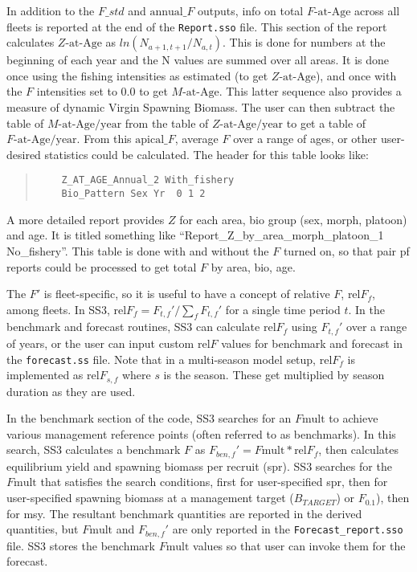 In addition to the $F\_std$ and $\text{annual\_}F$ outputs, info on total $F\text{-at-Age}$ across all fleets is reported at the end of the \texttt{Report.sso} file. This section of the report calculates $Z\text{-at-Age}$ as $ln(N_{a+1,t+1}/N_{a,t})$. This is done for numbers at the beginning of each year and the N values are summed over all areas. It is done once using the fishing intensities as estimated (to get $Z\text{-at-Age}$), and once with the $F$ intensities set to 0.0 to get $M\text{-at-Age}$. This latter sequence also provides a measure of dynamic Virgin Spawning Biomass. The user can then subtract the table of $M\text{-at-Age/year}$ from the table of $Z\text{-at-Age/year}$ to get a table of $F\text{-at-Age/year}$. From this $\text{apical\_}F$, average $F$ over a range of ages, or other user-desired statistics could be calculated. The header for this table looks like:
\begin{quote}
	\begin{verbatim}
	Z_AT_AGE_Annual_2 With_fishery
	Bio_Pattern Sex Yr  0 1 2
	\end{verbatim}
\end{quote}

A more detailed report provides $Z$ for each area, bio group (sex, morph, platoon) and age. It is titled something like ``Report\_Z\_by\_area\_morph\_platoon\_1 No\_fishery''. This table is done with and without the $F$ turned on, so that pair pf reports could be processed to get total $F$ by area, bio, age.

The $F'$ is fleet-specific, so it is useful to have a concept of relative $F$, $\text{rel}F_f$, among fleets. In SS3, $\text{rel}F_f= F_{t,f}'/\sum_{f}^{}F_{t,f}'$ for a single time period $t$. In the benchmark and forecast routines, SS3 can calculate $\text{rel}F_f$ using $F_{t,f}'$ over a range of years, or the user can input custom $\text{rel}F$ values for benchmark and forecast in the \texttt{forecast.ss} file. Note that in a multi-season model setup, $\text{rel}F_f$ is implemented as $\text{rel}F_{s,f}$ where $s$ is the season. These get multiplied by season duration as they are used.

In the benchmark section of the code, SS3 searches for an $F\text{mult}$ to achieve various management reference points (often referred to as benchmarks). In this search, SS3 calculates a benchmark $F$ as $F_{ben,f}' = F\text{mult} * \text{rel}F_f$, then calculates equilibrium yield and spawning biomass per recruit (\gls{spr}). SS3 searches for the $F\text{mult}$ that satisfies the search conditions, first for user-specified \gls{spr}, then for user-specified spawning biomass at a management target ($B_{TARGET}$) or $F_{0.1}$), then for \gls{msy}. The resultant benchmark quantities are reported in the derived quantities, but $F\text{mult}$ and $F_{ben,f}'$ are only reported in the \texttt{Forecast\_report.sso} file. SS3 stores the benchmark $F\text{mult}$ values so that user can invoke them for the forecast.


